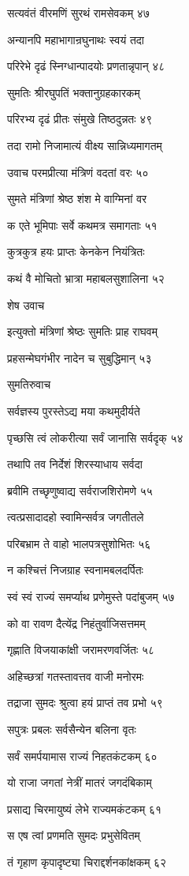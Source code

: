 सत्यवंतं वीरमणिं सुरथं रामसेवकम् ४७

अन्यानपि महाभागान्रघुनाथः स्वयं तदा

परिरेभे दृढं स्निग्धान्पादयोः प्रणतान्नृपान् ४८

सुमतिः श्रीरघुपतिं भक्तानुग्रहकारकम्

परिरभ्य दृढं प्रीतः संमुखे तिष्ठदुन्नतः ४९

तदा रामो निजामात्यं वीक्ष्य सान्निध्यमागतम्

उवाच परमप्रीत्या मंत्रिणं वदतां वरः ५०

सुमते मंत्रिणां श्रेष्ठ शंश मे वाग्मिनां वर

क एते भूमिपाः सर्वे कथमत्र समागताः ५१

कुत्रकुत्र हयः प्राप्तः केनकेन नियंत्रितः

कथं वै मोचितो भ्रात्रा महाबलसुशालिना ५२

शेष उवाच

इत्युक्तो मंत्रिणां श्रेष्ठः सुमतिः प्राह राघवम्

प्रहसन्मेघगंभीर नादेन च सुबुद्धिमान् ५३

सुमतिरुवाच

सर्वज्ञस्य पुरस्तेऽद्य मया कथमुदीर्यते

पृच्छसि त्वं लोकरीत्या सर्वं जानासि सर्वदृक् ५४

तथापि तव निर्देशं शिरस्याधाय सर्वदा

ब्रवीमि तच्छृणुष्वाद्य सर्वराजशिरोमणे ५५

त्वत्प्रसादादहो स्वामिन्सर्वत्र जगतीतले

परिबभ्राम ते वाहो भालपत्रसुशोभितः ५६

न कश्चित्तं निजग्राह स्वनामबलदर्पितः

स्वं स्वं राज्यं समर्प्याथ प्रणेमुस्ते पदांबुजम् ५७

को वा रावण दैत्येंद्र निहंतुर्वाजिसत्तमम्

गृह्णाति विजयाकांक्षी जरामरणवर्जितः ५८

अहिच्छत्रां गतस्तावत्तव वाजी मनोरमः

तद्राजा सुमदः श्रुत्वा हयं प्राप्तं तव प्रभो ५९

सपुत्रः प्रबलः सर्वसैन्येन बलिना वृतः

सर्वं समर्पयामास राज्यं निहतकंटकम् ६०

यो राजा जगतां नेत्रीं मातरं जगदंबिकाम्

प्रसाद्य चिरमायुष्यं लेभे राज्यमकंटकम् ६१

स एष त्वां प्रणमति सुमदः प्रभुसेवितम्

तं गृहाण कृपादृष्ट्या चिराद्दर्शनकांक्षकम् ६२

